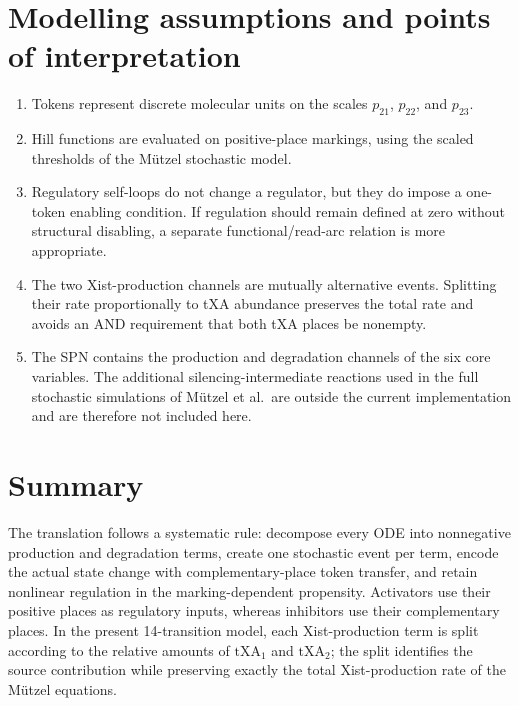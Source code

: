 \documentclass[11pt,a4paper]{article}
\newcommand{\txa}{\mathrm{tXA}}
\begin{document}
\section{Modelling assumptions and points of interpretation}

\begin{enumerate}
  \item Tokens represent discrete molecular units on the scales
        $p_{21}$, $p_{22}$, and $p_{23}$.
  \item Hill functions are evaluated on positive-place markings, using the
        scaled thresholds of the M\"utzel stochastic model.
  \item Regulatory self-loops do not change a regulator, but they do impose a
        one-token enabling condition.  If regulation should remain defined at
        zero without structural disabling, a separate functional/read-arc
        relation is more appropriate.
  \item The two Xist-production channels are mutually alternative events.
        Splitting their rate proportionally to tXA abundance preserves the
        total rate and avoids an AND requirement that both tXA places be
        nonempty.
  \item The SPN contains the production and degradation channels of the six
        core variables.  The additional silencing-intermediate reactions used
        in the full stochastic simulations of M\"utzel et al.\ are outside
        the current implementation and are therefore not included here.
\end{enumerate}

\section{Summary}

The translation follows a systematic rule: decompose every ODE into
nonnegative production and degradation terms, create one stochastic event per
term, encode the actual state change with complementary-place token transfer,
and retain nonlinear regulation in the marking-dependent propensity.
Activators use their positive places as regulatory inputs, whereas inhibitors
use their complementary places.  In the present 14-transition model, each
Xist-production term is split according to the relative amounts of
$\txa_1$ and $\txa_2$; the split identifies the source contribution while
preserving exactly the total Xist-production rate of the M\"utzel equations.
\end{document}
